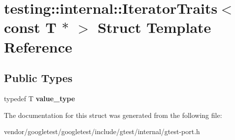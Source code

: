\hypertarget{structtesting_1_1internal_1_1IteratorTraits_3_01const_01T_01_5_01_4}{}\section{testing\+:\+:internal\+:\+:Iterator\+Traits$<$ const T $\ast$ $>$ Struct Template Reference}
\label{structtesting_1_1internal_1_1IteratorTraits_3_01const_01T_01_5_01_4}
\subsection*{Public Types}
\begin{DoxyCompactItemize}
\item 
typedef T {\bfseries value\+\_\+type}\hypertarget{structtesting_1_1internal_1_1IteratorTraits_3_01const_01T_01_5_01_4_ae7c8867223e106f374b56a7dc4a85547}{}\label{structtesting_1_1internal_1_1IteratorTraits_3_01const_01T_01_5_01_4_ae7c8867223e106f374b56a7dc4a85547}

\end{DoxyCompactItemize}


The documentation for this struct was generated from the following file\+:\begin{DoxyCompactItemize}
\item 
vendor/googletest/googletest/include/gtest/internal/gtest-\/port.\+h\end{DoxyCompactItemize}
